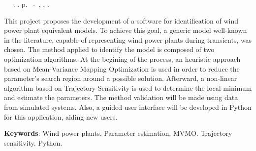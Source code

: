 \begin{resumo}

\begin{flushleft} 
	\setlength{\absparsep}{0pt} %
	\SingleSpacing 
 	\imprimirautorabr~ ~\textbf{\imprimirtitulo}.	\imprimirdata.  \pageref{LastPage}p. 
	\imprimirtipotrabalho~-~\imprimirinstituicao, \imprimirlocal, 	\imprimirdata. 
\end{flushleft}

\OnehalfSpacing

This project proposes the development of a software for identification of wind power plant equivalent models. To achieve this goal, a generic model well-known in the literature, capable of representing wind power plants during transients, was chosen. The method applied to identify the model is composed of two optimization algorithms. At the begining of the process, an heuristic approach based on Mean-Variance Mapping Optimization is used in order to reduce the parameter's search region around a possible solution. Afterward, a non-linear algorithm based on Trajectory Sensitivity is used to determine the local minimum and estimate the parameters. The method validation will be made using data from simulated systems. Also, a guided user interface will be developed in Python for this application, aiding new users.


\textbf{Keywords}: Wind power plants. Parameter estimation. MVMO. Trajectory sensitivity. Python.

\end{resumo}
